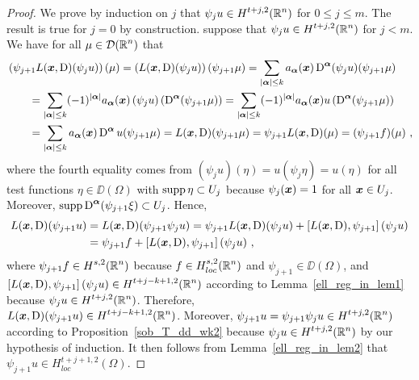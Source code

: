 \begin{proof}
We prove by induction on $j$ that $\displaystyle \psi_j u \in H^{t+j,2}(\mathbb{R}^n)$
for $0 \leq j \leq m$.  The result is true for $j=0$ by construction.  
suppose that $\displaystyle \psi_j u \in H^{t+j,2}(\mathbb{R}^n)$ for $j <m$.
We have for all $\displaystyle \mu \in \mathcal{D}(\mathbb{R}^n)$ that
\begin{align*}
&\left(\psi_{j+1} L({\bm{x}},\operatorname{D}) (\psi_j u)\right)(\mu)
= \left(L({\bm{x}},\operatorname{D}) (\psi_j u)\right) (\psi_{j+1} \mu)
= \sum_{|{\bm{\alpha}}|\leq k} a_{{\bm{\alpha}}}({\bm{x}})
\operatorname{D}^{{\bm{\alpha}}}(\psi_j u)(\psi_{j+1} \mu) \\
&\qquad = \sum_{|{\bm{\alpha}}|\leq k} (-1)^{|{\bm{\alpha}}|}
a_{{\bm{\alpha}}}({\bm{x}})
\left(\psi_j u\right) \left(\operatorname{D}^{{\bm{\alpha}}}(\psi_{j+1} \mu)\right)
= \sum_{|{\bm{\alpha}}|\leq k} (-1)^{|{\bm{\alpha}}|} a_{{\bm{\alpha}}}({\bm{x}}) u
\left(\operatorname{D}^{{\bm{\alpha}}}(\psi_{j+1} \mu)\right) \\
&\qquad = \sum_{|{\bm{\alpha}}|\leq k} a_{{\bm{\alpha}}}({\bm{x}})
\operatorname{D}^{{\bm{\alpha}}} u (\psi_{j+1} \mu)
= L({\bm{x}},\operatorname{D}) (\psi_{j+1} \mu)
= \psi_{j+1} L({\bm{x}},\operatorname{D}) (\mu)
= (\psi_{j+1} f)(\mu) \ ,
\end{align*}
where the fourth equality comes from
$\displaystyle \left(\psi_j u\right)(\eta) = u(\psi_j \eta) = u(\eta)$
for all test functions $\eta \in \DD(\Omega)$ with
$\operatorname{supp} \eta \subset U_j$ because
$\psi_j({\bm{x}}) = 1$ for all ${\bm{x}} \in U_j$.  Moreover, 
$\displaystyle \operatorname{supp} \operatorname{D}^{{\bm{\alpha}}}(\psi_{j+1} \xi) \subset U_j$.
Hence,
\begin{align*}
L({\bm{x}},\operatorname{D})(\psi_{j+1} u)
&= L({\bm{x}},\operatorname{D})(\psi_{j+1} \psi_j u)
= \psi_{j+1} L({\bm{x}},\operatorname{D})(\psi_j u)
+ \left[ L({\bm{x}},\operatorname{D}),\psi_{j+1}\right](\psi_j u) \\
&= \psi_{j+1} f + \left[ L({\bm{x}},\operatorname{D}),\psi_{j+1}\right](\psi_j u) \ ,
\end{align*}
where $\displaystyle \psi_{j+1} f \in H^{s,2}(\mathbb{R}^n)$ because
$\displaystyle f \in H^{s,2}_{loc}(\mathbb{R}^n)$ and $\psi_{j+1} \in \DD(\Omega)$,
and $\displaystyle \left[ L({\bm{x}},\operatorname{D}),\psi_{j+1}\right](\psi_j u)
\in H^{t+j-k+1,2}(\mathbb{R}^n)$ according to 
Lemma~\ref{ell_reg_in_lem1} because
$\displaystyle \psi_j u \in H^{t+j,2}(\mathbb{R}^n)$.
Therefore, \\
$\displaystyle L({\bm{x}},\operatorname{D})(\psi_{j+1} u) \in H^{t+j-k+1,2}(\mathbb{R}^n)$.
Moreover,
$\displaystyle \psi_{j+1} u = \psi_{j+1}\psi_j u \in H^{t+j,2}(\mathbb{R}^n)$
according to Proposition~\ref{sob_T_dd_wk2} because
$\displaystyle \psi_j u \in H^{t+j,2}(\mathbb{R}^n)$ by our hypothesis of induction.
It then follows from Lemma~\ref{ell_reg_in_lem2} that
$\displaystyle \psi_{j+1} u \in H^{t+j+1,2}_{loc}(\Omega)$.


\end{proof}
